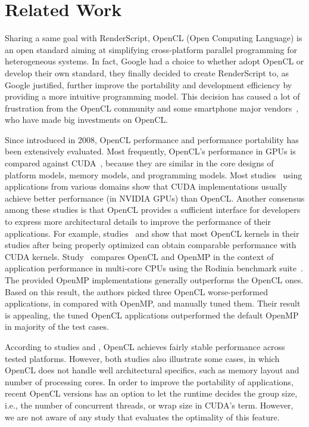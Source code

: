 \section*{Related Work}

Sharing a same goal with RenderScript, OpenCL (Open Computing Language)
\cite{OpenCL} is an open standard aiming at simplifying cross-platform
parallel programming for heterogeneous systems. In fact, Google had a choice to
whether adopt OpenCL or develop their own standard, they finally decided to
create RenderScript to, as Google justified, further improve the
portability and development efficiency by providing a more intuitive programming
model. This decision has caused a lot of frustration from the OpenCL community
\cite{androidblockopenCL} and some smartphone major vendors~\cite{googlelockin},
who have made big investments on OpenCL.

Since introduced in 2008, OpenCL performance and performance portability has
been extensively evaluated. Most frequently, OpenCL's performance in GPUs is
compared against CUDA~\cite{fang2011comprehensive, weber2011comparing,
van2011correlating, vassilev2010comparison, amorim2009comparing,
karimi2010performance, komatsu2010evaluating}, because they are similar in the
core designs of platform models, memory models, and programming models.  Most
studies~\cite{weber2011comparing, van2011correlating, vassilev2010comparison,
amorim2009comparing} using applications from various domains show that
CUDA implementations usually achieve better performance (in NVIDIA GPUs) than
OpenCL. Another consensus among these studies is that OpenCL provides a sufficient
interface for developers to express more architectural details to improve the
performance of their applications. For example,
studies~\cite{komatsu2010evaluating} and \cite{fang2011comprehensive} show that
most OpenCL kernels in their studies after being properly optimized can obtain
comparable performance with CUDA kernels.  Study~\cite{shen2012performance}
compares OpenCL and OpenMP in the context of application performance in
multi-core CPUs using the Rodinia benchmark suite~\cite{che2009rodinia}. The
provided OpenMP implementations generally outperforms the OpenCL ones.
Based on this result, the authors picked three OpenCL worse-performed
applications, in compared with OpenMP, and manually tuned them.  Their
result is appealing, the tuned OpenCL applications outperformed the default
OpenMP in majority of the test cases.

According to studies \cite{komatsu2010evaluating} and \cite{dolbeau2013one},
OpenCL achieves fairly stable performance across tested platforms. However, both
studies also illustrate some cases, in which OpenCL does not handle
well architectural specifics, such as memory layout and number of processing
cores. In order to improve the portability of applications, recent OpenCL
versions has an option to let the runtime decides the group size, i.e., the
number of concurrent threads, or wrap size in CUDA's term. However, we are not
aware of any study that evaluates the optimality of this feature.

